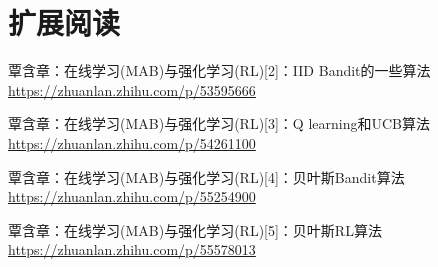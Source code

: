 \documentclass[12pt]{article}
\begin{document}
\section{扩展阅读}
覃含章：在线学习(MAB)与强化学习(RL)[2]：IID Bandit的一些算法
\url{https://zhuanlan.zhihu.com/p/53595666}

覃含章：在线学习(MAB)与强化学习(RL)[3]：Q learning和UCB算法
\url{https://zhuanlan.zhihu.com/p/54261100}

覃含章：在线学习(MAB)与强化学习(RL)[4]：贝叶斯Bandit算法
\url{https://zhuanlan.zhihu.com/p/55254900}

覃含章：在线学习(MAB)与强化学习(RL)[5]：贝叶斯RL算法
\url{https://zhuanlan.zhihu.com/p/55578013}




\end{document}

